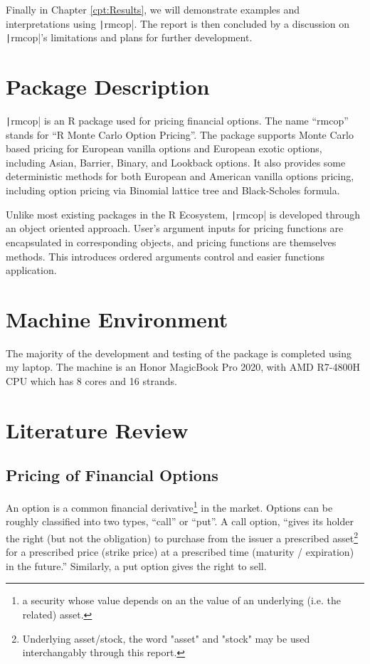 Finally in Chapter \ref{cpt:Results}, we will demonstrate examples and interpretations using \texttt|rmcop|. The report is then concluded by a discussion on \texttt|rmcop|'s limitations and plans for further development.

\section{Package Description} \label{sec:Pkg Description}

\texttt|rmcop| is an R package used for pricing financial options. The name ``rmcop'' stands for ``R Monte Carlo Option Pricing''. The package supports Monte Carlo based pricing for European vanilla options and European exotic options, including Asian, Barrier, Binary, and Lookback options. It also provides some deterministic methods for both European and American vanilla options pricing, including option pricing via Binomial lattice tree and Black-Scholes formula.

Unlike most existing packages in the R Ecosystem, \texttt|rmcop| is developed through an object oriented approach. User's argument inputs for pricing functions are encapsulated in corresponding objects, and pricing functions are themselves methods. This introduces ordered arguments control and easier functions application.

\section{Machine Environment}

The majority of the development and testing of the package is completed using my laptop. The machine is an Honor MagicBook Pro 2020, with AMD R7-4800H CPU which has 8 cores and 16 strands.

\section{Literature Review} \label{sec:Literature Review}

\subsection{Pricing of Financial Options}

An option is a common financial derivative\footnote{a security whose value depends on an the value of an underlying (i.e. the related) asset.} in the market. Options can be roughly classified into two types, ``call'' or ``put''. A call option, ``gives its holder the right (but not the obligation) to purchase from the issuer a prescribed asset\footnote{Underlying asset/stock, the word "asset" and "stock" may be used interchangably through this report.} for a prescribed price (strike price) at a prescribed time (maturity / expiration) in the future.\cite{Higham2004}'' Similarly, a put option gives the right to sell.

